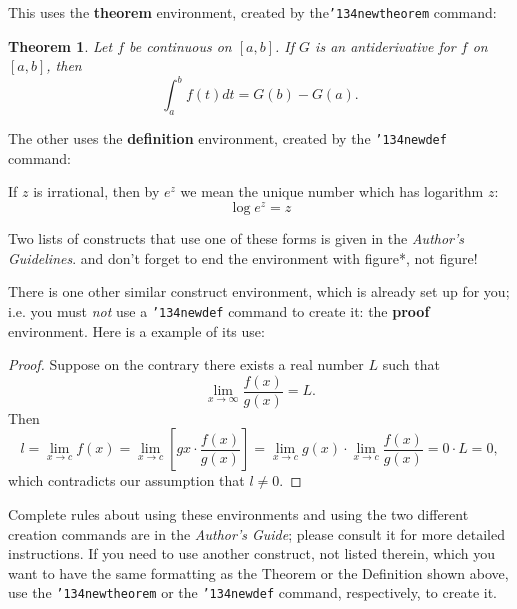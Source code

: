 \documentclass{acm_proc_article-sp}
\begin{document}
This uses the \textbf{theorem} environment, created by
the\linebreak\texttt{{\char'134}newtheorem} command:
\newtheorem{theorem}{Theorem}
\begin{theorem}
Let $f$ be continuous on $[a,b]$.  If $G$ is
an antiderivative for $f$ on $[a,b]$, then
\begin{displaymath}\int^b_af(t)dt = G(b) - G(a).\end{displaymath}
\end{theorem}

The other uses the \textbf{definition} environment, created
by the \texttt{{\char'134}newdef} command:
\begin{definition}
If $z$ is irrational, then by $e^z$ we mean the
unique number which has
logarithm $z$: \begin{displaymath}{\log e^z = z}\end{displaymath}
\end{definition}

Two lists of constructs that use one of these
forms is given in the
\textit{Author's  Guidelines}.
and don't forget to end the environment with
{figure*}, not {figure}!
 
There is one other similar construct environment, which is
already set up
for you; i.e. you must \textit{not} use
a \texttt{{\char'134}newdef} command to
create it: the \textbf{proof} environment.  Here
is a example of its use:
\begin{proof}
Suppose on the contrary there exists a real number $L$ such that
\begin{displaymath}
\lim_{x\rightarrow\infty} \frac{f(x)}{g(x)} = L.
\end{displaymath}
Then
\begin{displaymath}
l=\lim_{x\rightarrow c} f(x)
= \lim_{x\rightarrow c}
\left[ g{x} \cdot \frac{f(x)}{g(x)} \right ]
= \lim_{x\rightarrow c} g(x) \cdot \lim_{x\rightarrow c}
\frac{f(x)}{g(x)} = 0\cdot L = 0,
\end{displaymath}
which contradicts our assumption that $l\neq 0$.
\end{proof}

Complete rules about using these environments and using the
two different creation commands are in the
\textit{Author's Guide}; please consult it for more
detailed instructions.  If you need to use another construct,
not listed therein, which you want to have the same
formatting as the Theorem
or the Definition shown above,
use the \texttt{{\char'134}newtheorem} or the
\texttt{{\char'134}newdef} command,
respectively, to create it.
\end{document}
